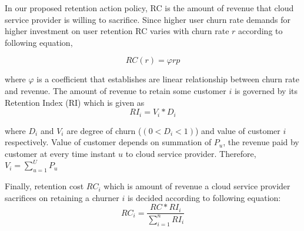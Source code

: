 In our proposed retention action policy, RC is the amount of revenue that cloud service provider is willing to sacrifice. Since higher user churn rate demands for higher investment on user retention RC varies with churn rate $r$ according to following equation,

\begin{equation}
RC(r )= \varphi rp
\label{eq:retention}
\end{equation}


where $\varphi$ is a coefficient that establishes are linear relationship between churn rate and revenue. The amount of revenue to retain some customer $i$ is governed by its Retention Index (RI) which is given as
\begin{equation}
 RI_i=V_i *D_i 
\label{fixed}
\end{equation}

where $D_i$ and $V_i$ are degree of churn ($(0<D_i<1 )$) and value of customer $i$ respectively. Value of customer depends on summation of $P_u$, the revenue paid by customer at every time instant $u$ to cloud service provider. Therefore,  $V_i= \sum_{u=1}^U P_u$

Finally, retention cost $RC_{i}$ which is amount of revenue  a cloud service provider sacrifices on retaining a churner $i$ is decided according to following equation: 
\begin{equation}
RC_i=\dfrac{RC*RI_i}{\sum_{i=1}^n RI_i} 
\label{fixed}
\end{equation}



